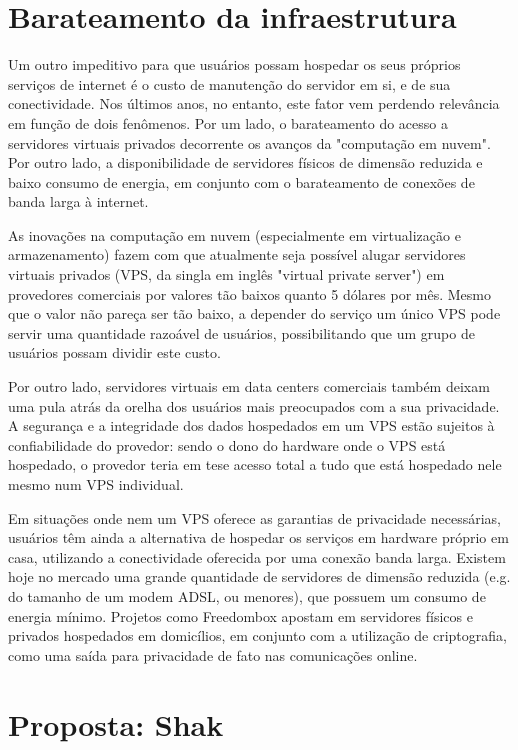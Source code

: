 \begin{anexosenv}
\section{Barateamento da infraestrutura}

Um outro impeditivo para que usuários possam hospedar os seus próprios serviços
de internet é o custo de manutenção do servidor em si, e de sua conectividade.
Nos últimos anos, no entanto, este fator vem perdendo relevância em função de
dois fenômenos. Por um lado, o barateamento do acesso a servidores virtuais
privados decorrente os avanços da "computação em nuvem". Por outro lado, a
disponibilidade de servidores físicos de dimensão reduzida e baixo consumo de
energia, em conjunto com o barateamento de conexões de banda larga à internet.

As inovações na computação em nuvem (especialmente em virtualização e
armazenamento) fazem com que atualmente seja possível alugar servidores
virtuais privados (VPS, da singla em inglês "virtual private server") em
provedores comerciais por valores tão baixos quanto 5 dólares por mês. Mesmo
que o valor não pareça ser tão baixo, a depender do serviço um único VPS pode
servir uma quantidade razoável de usuários, possibilitando que um grupo de
usuários possam dividir este custo.

Por outro lado, servidores virtuais em data centers comerciais também deixam
uma pula atrás da orelha dos usuários mais preocupados com a sua privacidade. A
segurança e a integridade dos dados hospedados em um VPS estão sujeitos à
confiabilidade do provedor: sendo o dono do hardware onde o VPS está
hospedado, o provedor teria em tese acesso total a tudo que está hospedado nele
mesmo num VPS individual.

Em situações onde nem um VPS oferece as garantias de privacidade necessárias,
usuários têm ainda a alternativa de hospedar os serviços em hardware próprio
em casa, utilizando a conectividade oferecida por uma conexão banda larga.
Existem hoje no mercado uma grande quantidade de servidores de dimensão
reduzida (e.g. do tamanho de um modem ADSL, ou menores), que possuem um consumo
de energia mínimo. Projetos como Freedombox apostam em servidores
físicos e privados hospedados em domicílios, em conjunto com a utilização de
criptografia, como uma saída para privacidade de fato nas comunicações
online.

\section{Proposta: Shak}


\end{anexosenv}
